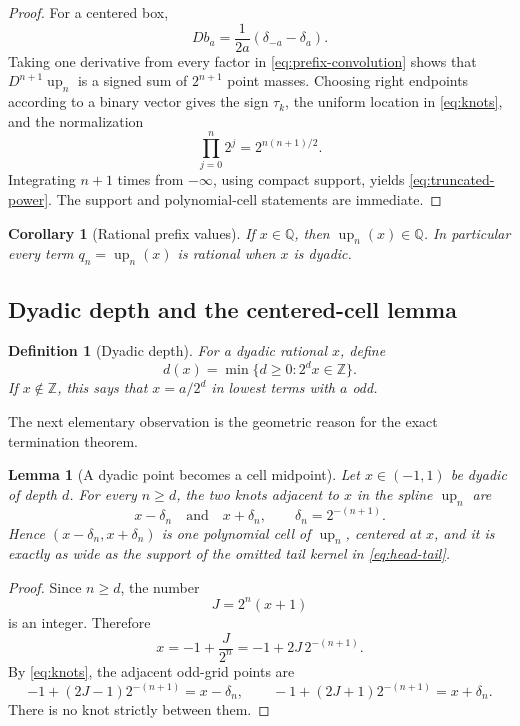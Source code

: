 \documentclass[11pt]{article}
\newtheorem{lemma}[theorem]{Lemma}
\newtheorem{corollary}[theorem]{Corollary}
\newtheorem{definition}[theorem]{Definition}
\newcommand{\Z}{\mathbb{Z}}
\newcommand{\upf}{\operatorname{up}}
\begin{document}
\begin{proof}
For a centered box,
\[
 Db_a=\frac{1}{2a}(\delta_{-a}-\delta_a).
\]
Taking one derivative from every factor in \cref{eq:prefix-convolution} shows
that \(D^{n+1}\upf_n\) is a signed sum of \(2^{n+1}\) point masses.  Choosing
right endpoints according to a binary vector gives the sign \(\tau_k\), the
uniform location in \cref{eq:knots}, and the normalization
\[
 \prod_{j=0}^{n}2^j=2^{n(n+1)/2}.
\]
Integrating \(n+1\) times from \(-\infty\), using compact support, yields
\cref{eq:truncated-power}.  The support and polynomial-cell statements are
immediate.
\end{proof}

\begin{corollary}[Rational prefix values]\label{cor:prefix-rational}
If \(x\in\mathbb{Q}\), then \(\upf_n(x)\in\mathbb{Q}\).  In particular every
term \(q_n=\upf_n(x)\) is rational when \(x\) is dyadic.
\end{corollary}

\subsection{Dyadic depth and the centered-cell lemma}

\begin{definition}[Dyadic depth]\label{def:depth}
For a dyadic rational \(x\), define
\[
 d(x)=\min\{d\ge0:2^d x\in\Z\}.
\]
If \(x\notin\Z\), this says that \(x=a/2^d\) in lowest terms with \(a\) odd.
\end{definition}

The next elementary observation is the geometric reason for the exact
termination theorem.

\begin{lemma}[A dyadic point becomes a cell midpoint]\label{lem:centered-cell}
Let \(x\in(-1,1)\) be dyadic of depth \(d\).  For every \(n\ge d\), the two
knots adjacent to \(x\) in the spline \(\upf_n\) are
\[
 x-\delta_n\quad\text{and}\quad x+\delta_n,
 \qquad \delta_n=2^{-(n+1)}.
\]
Hence \((x-\delta_n,x+\delta_n)\) is one polynomial cell of \(\upf_n\), centered
at \(x\), and it is exactly as wide as the support of the omitted tail kernel
in \cref{eq:head-tail}.
\end{lemma}

\begin{proof}
Since \(n\ge d\), the number
\[
 J=2^n(x+1)
\]
is an integer.  Therefore
\[
 x=-1+\frac{J}{2^n}=-1+2J\,2^{-(n+1)}.
\]
By \cref{eq:knots}, the adjacent odd-grid points are
\[
 -1+(2J-1)2^{-(n+1)}=x-\delta_n,
 \qquad
 -1+(2J+1)2^{-(n+1)}=x+\delta_n.
\]
There is no knot strictly between them.
\end{proof}
\end{document}
